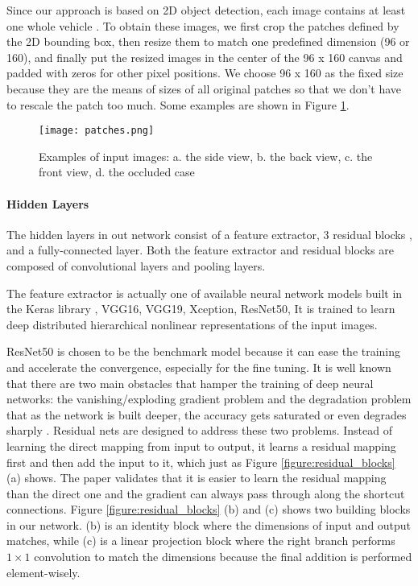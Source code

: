 Since our approach is based on 2D object detection, each image contains at least one whole vehicle . To obtain these images, we first crop the patches defined by the 2D bounding box, then resize them to match one predefined dimension (96 or 160), and finally put the resized images in the center of the 96 x 160 canvas and padded with zeros for other pixel positions. We choose 96 x 160 as the fixed size because they are the means of sizes of all original patches so that we don't have to rescale the patch too much.  Some examples are shown in Figure \ref{figure:patches}.

\begin{figure}[h]		
	\texttt{[image: patches.png]}
	\caption{Examples of input images: a. the side view, b. the back view, c. the front view, d. the occluded case}
	\centering
	\label{figure:patches}
\end{figure}

\paragraph{Hidden Layers}
The hidden layers in out network consist of a feature extractor, 3 residual blocks \cite{DBLP:journals/corr/HeZRS15}, and a fully-connected layer. Both the feature extractor and residual blocks are composed of convolutional layers and pooling layers.

The feature extractor is actually one of available neural network models built in the Keras library \cite{chollet2015keras}, \ie VGG16, VGG19, Xception, ResNet50, \etc It is trained to  learn deep distributed hierarchical nonlinear representations of the input images.

 ResNet50 \cite{DBLP:journals/corr/HeZRS15} is chosen to be the benchmark model because it can ease the training and accelerate the convergence, especially for the fine tuning. It is well known that there are two main obstacles that hamper the training of deep neural networks: the vanishing/exploding gradient problem \cite{Bengio:1994:LLD:2325857.2328340} \cite{pmlr-v9-glorot10a} and the degradation problem that as the network is built deeper, the accuracy gets saturated or even degrades sharply \cite{DBLP:journals/corr/He014}. Residual nets are designed to address these two problems. Instead of learning the direct mapping from input to output, it learns a residual mapping first and then add the input to it, which just as Figure \ref{figure:residual_blocks} (a) shows. The paper validates that it is easier to learn the residual mapping than the direct one and the gradient can always pass through along the shortcut connections. Figure \ref{figure:residual_blocks} (b) and (c) shows two building blocks in our network. (b) is an identity block where the dimensions of input and output matches, while (c) is a linear projection block where the right branch performs $1\times1$ convolution to match the dimensions because the final addition is performed element-wisely.

